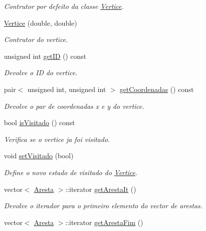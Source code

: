\begin{DoxyCompactItemize}
\begin{DoxyCompactList}\small\item\em Contrutor por defeito da classe \hyperlink{class_vertice}{Vertice}. \end{DoxyCompactList}\item 
\hyperlink{class_vertice_a107fa033352ce81efe33b0e695c71cb4}{Vertice} (double, double)
\begin{DoxyCompactList}\small\item\em Contrutor do vertice. \end{DoxyCompactList}\item 
unsigned int \hyperlink{class_vertice_acac820c5ad82c3b43d9cbf081fe2a200}{get\-I\-D} () const 
\begin{DoxyCompactList}\small\item\em Devolve o I\-D do vertice. \end{DoxyCompactList}\item 
pair$<$ unsigned int, unsigned int $>$ \hyperlink{class_vertice_af69a0aae83769e8c96dffd301cee2c05}{get\-Coordenadas} () const 
\begin{DoxyCompactList}\small\item\em Devolve o par de coordenadas x e y do vertice. \end{DoxyCompactList}\item 
bool \hyperlink{class_vertice_a6872ffde2b42147b80a5950e690fef42}{is\-Visitado} () const 
\begin{DoxyCompactList}\small\item\em Verifica se o vertice ja foi visitado. \end{DoxyCompactList}\item 
void \hyperlink{class_vertice_a3d05fb583a90a813ad39f46dec911e6c}{set\-Visitado} (bool)
\begin{DoxyCompactList}\small\item\em Define o novo estado de visitado do \hyperlink{class_vertice}{Vertice}. \end{DoxyCompactList}\item 
vector$<$ \hyperlink{class_aresta}{Aresta} $>$\-::iterator \hyperlink{class_vertice_a3ea398756dcfde3c7bfd492b2e7aed90}{get\-Aresta\-It} ()
\begin{DoxyCompactList}\small\item\em Devolve o iterador para o primeiro elemento do vector de arestas. \end{DoxyCompactList}\item 
vector$<$ \hyperlink{class_aresta}{Aresta} $>$\-::iterator \hyperlink{class_vertice_ac1e8e0915d31103d97e4631b151e97f1}{get\-Aresta\-Fim} ()

\end{DoxyCompactItemize}
